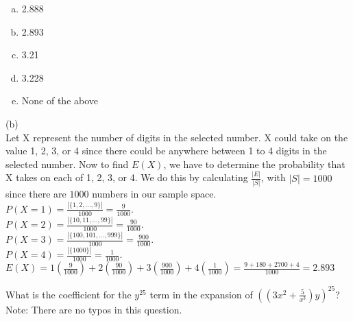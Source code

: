 \newpage
\begin{enumerate}[(a)]
	\item  2.888
    
	\item  2.893
    
	\item  3.21
    
	\item  3.228
    
	\item  None of the above

\end{enumerate}
\begin{solution}

(b) \\
Let X represent the number of digits in the selected number. X could take on the value 1, 2, 3, or 4 since there could be anywhere between 1 to 4 digits in the selected number. Now to find $E(X)$, we have to determine the probability that X takes on each of 1, 2, 3, or 4. We do this by calculating $\frac{|E|}{|S|}$, with $|S| = 1000$ since there are $1000$ numbers in our sample space.\\
\newline
$P(X = 1) = \frac{|\{1, 2, \dots, 9\}|}{1000} = \frac{9}{1000}$.\\
$P(X = 2) = \frac{|\{10, 11, \dots, 99\}|}{1000} = \frac{90}{1000}$.\\
$P(X = 3) = \frac{|\{100, 101, \dots, 999\}|}{1000} = \frac{900}{1000}$.\\
$P(X = 4) = \frac{|\{1000\}|}{1000} = \frac{1}{1000}$.\\
\newline
    $E(X) = 1 (\frac{9}{1000}) + 2 (\frac{90}{1000}) + 3 (\frac{900}{1000}) + 4 (\frac{1}{1000}) = \frac{9 + 180 + 2700 + 4}{1000} = 2.893$


\end{solution}


What is the coefficient for the $y^{25}$ term in the expansion of $((3x^2+\frac{5}{x^3})y)^{25}$? \\
Note: There are no typos in this question.

